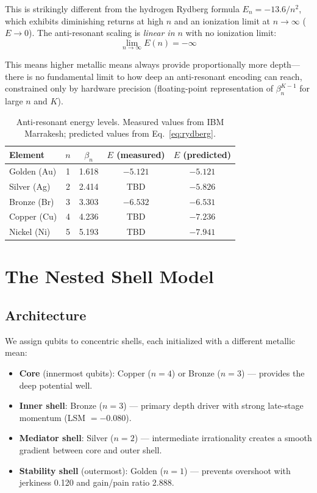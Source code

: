 \documentclass[twocolumn,showpacs,preprintnumbers,amsmath,amssymb,aps,prl]{revtex4-2}
\begin{document}
This is strikingly different from the hydrogen Rydberg formula $E_n = -13.6/n^2$, which exhibits diminishing returns at high $n$ and an ionization limit at $n \to \infty$ ($E \to 0$). The anti-resonant scaling is \emph{linear in $n$} with no ionization limit:
\begin{equation}
    \lim_{n \to \infty} E(n) = -\infty
\end{equation}

This means higher metallic means always provide proportionally more depth---there is no fundamental limit to how deep an anti-resonant encoding can reach, constrained only by hardware precision (floating-point representation of $\beta_n^{K-1}$ for large $n$ and $K$).

\begin{table}[h]
\centering
\caption{Anti-resonant energy levels. Measured values from IBM Marrakesh; predicted values from Eq.~\eqref{eq:rydberg}.}
\label{tab:energy_levels}
\begin{tabular}{lcccc}
\toprule
\textbf{Element} & $n$ & $\beta_n$ & \textbf{$E$ (measured)} & \textbf{$E$ (predicted)} \\
\midrule
Golden (Au) & 1 & 1.618 & $-5.121$ & $-5.121$ \\
Silver (Ag) & 2 & 2.414 & TBD & $-5.826$ \\
Bronze (Br) & 3 & 3.303 & $-6.532$ & $-6.531$ \\
Copper (Cu) & 4 & 4.236 & TBD & $-7.236$ \\
Nickel (Ni) & 5 & 5.193 & TBD & $-7.941$ \\
\bottomrule
\end{tabular}
\end{table}


\section{The Nested Shell Model}
\label{sec:shells}

\subsection{Architecture}

We assign qubits to concentric shells, each initialized with a different metallic mean:

\begin{itemize}
    \item \textbf{Core} (innermost qubits): Copper ($n\!=\!4$) or Bronze ($n\!=\!3$) --- provides the deep potential well.
    \item \textbf{Inner shell}: Bronze ($n\!=\!3$) --- primary depth driver with strong late-stage momentum (LSM $= -0.080$).
    \item \textbf{Mediator shell}: Silver ($n\!=\!2$) --- intermediate irrationality creates a smooth gradient between core and outer shell.
    \item \textbf{Stability shell} (outermost): Golden ($n\!=\!1$) --- prevents overshoot with jerkiness 0.120 and gain/pain ratio 2.888.
\end{itemize}
\end{document}
